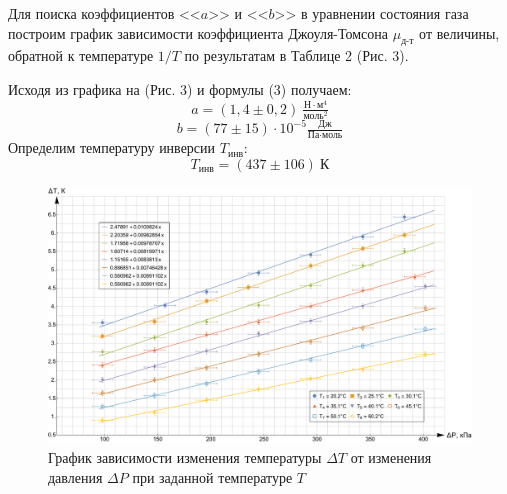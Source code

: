 \documentclass[a4paper,12pt]{article}
\theoremstyle{plain} %
\theoremstyle{definition} %
\theoremstyle{remark} %
\begin{document}
	Для поиска коэффициентов <<$a$>> и <<$b$>> в уравнении состояния газа построим график зависимости коэффициента Джоуля-Томсона $\mu_{\text{д-т}}$ от величины, обратной к температуре $1/T$ по результатам в Таблице 2 (Рис. 3).
	
	Исходя из графика на (Рис. 3) и формулы (3) получаем:
	\[a = (1,4\pm0,2)\  \tfrac{\text{Н}\cdot\text{м}^4}{\text{моль}^2}\]
	\[b = (77\pm15)  \cdot 10^{-5} \tfrac{\text{Дж}}{\text{Па} \cdot \text{моль}}\]
	Определим температуру инверсии $T_\text{инв}$:
	\[T_\text{инв}  = (437\pm106) \ \text{К}\]
	\begin{figure}[H]
		\includegraphics[width=\linewidth]{2}
		\captionsetup{justification=centering}
		\caption{График зависимости изменения температуры $\Delta T$ от изменения давления $\Delta P$ при заданной температуре $T$}
	\end{figure}
\end{document}
